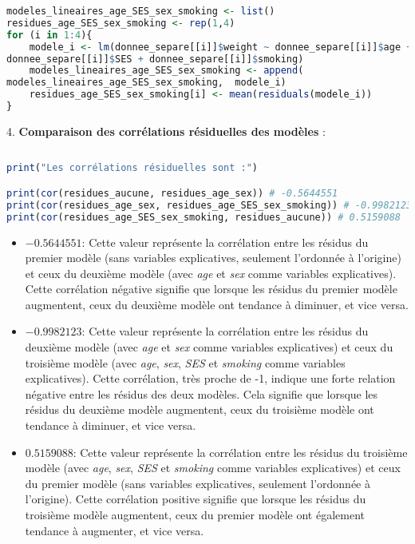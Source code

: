 \documentclass[12pt,a4paper]{article}
\begin{document}
    \begin {lstlisting}[language=R]
   modeles_lineaires_age_SES_sex_smoking <- list()
residues_age_SES_sex_smoking <- rep(1,4)
for (i in 1:4){
    modele_i <- lm(donnee_separe[[i]]$weight ~ donnee_separe[[i]]$age + donnee_separe[[i]]$sex + 
donnee_separe[[i]]$SES + donnee_separe[[i]]$smoking)
    modeles_lineaires_age_SES_sex_smoking <- append(
modeles_lineaires_age_SES_sex_smoking,  modele_i)
    residues_age_SES_sex_smoking[i] <- mean(residuals(modele_i))
}

   \end{lstlisting}

4. \textbf{Comparaison des corrélations résiduelles des modèles} :

   \begin {lstlisting}[language=R]
   
print("Les corrélations résiduelles sont :")

print(cor(residues_aucune, residues_age_sex)) # -0.5644551
print(cor(residues_age_sex, residues_age_SES_sex_smoking)) # -0.9982123
print(cor(residues_age_SES_sex_smoking, residues_aucune)) # 0.5159088

   \end{lstlisting}

\begin{itemize}
    \item \(-0.5644551\): Cette valeur représente la corrélation entre les résidus du premier modèle (sans variables explicatives, seulement l'ordonnée à l'origine) et ceux du deuxième modèle (avec \textit{age} et \textit{sex} comme variables explicatives). Cette corrélation négative signifie que lorsque les résidus du premier modèle augmentent, ceux du deuxième modèle ont tendance à diminuer, et vice versa.
    
    \item \(-0.9982123\): Cette valeur représente la corrélation entre les résidus du deuxième modèle (avec \textit{age} et \textit{sex} comme variables explicatives) et ceux du troisième modèle (avec \textit{age}, \textit{sex}, \textit{SES} et \textit{smoking} comme variables explicatives). Cette corrélation, très proche de -1, indique une forte relation négative entre les résidus des deux modèles. Cela signifie que lorsque les résidus du deuxième modèle augmentent, ceux du troisième modèle ont tendance à diminuer, et vice versa.
    
    \item \(0.5159088\): Cette valeur représente la corrélation entre les résidus du troisième modèle (avec \textit{age}, \textit{sex}, \textit{SES} et \textit{smoking} comme variables explicatives) et ceux du premier modèle (sans variables explicatives, seulement l'ordonnée à l'origine). Cette corrélation positive signifie que lorsque les résidus du troisième modèle augmentent, ceux du premier modèle ont également tendance à augmenter, et vice versa.
\end{itemize}
\end{document}
